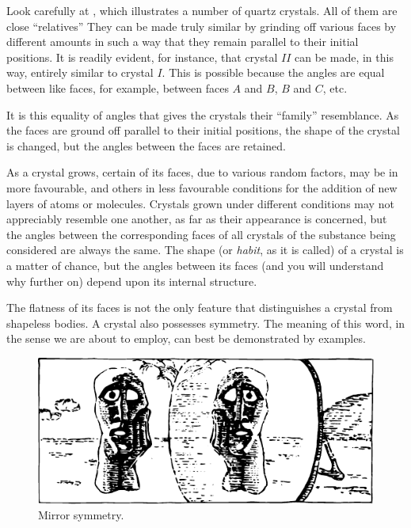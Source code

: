 Look carefully at , which illustrates a number of quartz crystals. All of them are close ``relatives'' They can be made truly similar by grinding off various faces by different amounts in such a way that they remain parallel to their initial positions. It is readily evident, for instance, that crystal $II$ can be made, in this way, entirely similar to crystal $I$. This is possible because the angles are equal between like faces, for example, be­tween faces $A$ and $B$, $B$ and $C$, etc.

It is this equality of angles that gives the crystals their ``family'' resemblance. As the faces are ground off parallel to their initial positions, the shape of the crystal is changed, but the angles between the faces are retained.

As a crystal grows, certain of its faces, due to various random factors, may be in more favourable, and others in less favourable conditions for the addition of new layers of atoms or molecules. Crystals grown under different conditions may not appreciably resemble one another, as far as their appearance is concerned, but the angles be­tween the corresponding faces of all crystals of the substance being considered are always the same. The shape (or \emph{habit}, as it is called) of a crystal is a matter of chance, but the angles between its faces (and you will understand why further on) depend upon its internal structure.

The flatness of its faces is not the only feature that distinguishes a crystal from shapeless bodies. A crystal also possesses symmetry. The meaning of this word, in the sense we are about to employ, can best be demonstrat­ed by examples.

\begin{figure}[!ht]
\centering
\includegraphics[width=\textwidth]{figures/fig-02-07.pdf}
\caption{Mirror symmetry.}
\label{fig-2.7}
\end{figure}



